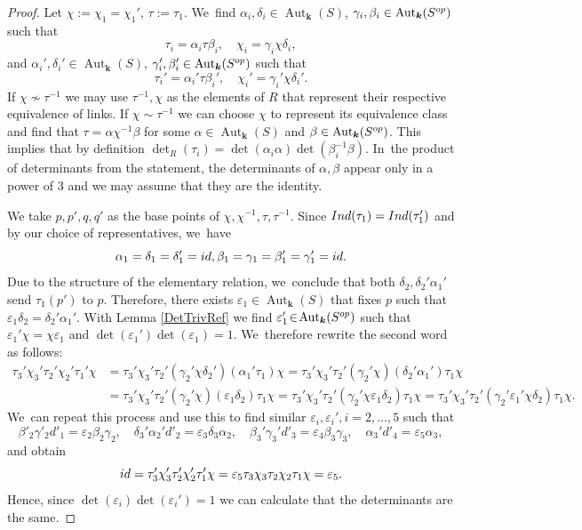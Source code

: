 \documentclass[10pt,a4paper]{amsart}
\newcommand{\id}{\textup{id}}
\newcommand{\Ind}{\textup{Ind}}
\newcommand{\op}{\textup{op}}
\let\epsilon\varepsilon
\theoremstyle{definition}
\newcommand{\kk}{{\boldsymbol{k}}}
\DeclareMathOperator{\Aut}{Aut}
\begin{document}
\begin{proof}
Let $\chi := \chi_1 = \chi_1'$, $\tau:= \tau_1$. We~find $\alpha_i, \delta_i \in \Aut_{\kk}(S)$, $\gamma_i, \beta_i \in \Aut_{\kk}(S^{\op}) $ such that
\[
\tau_i = \alpha_i \tau \beta_i, \quad \chi_i = \gamma_i \chi \delta_i,
\]
and $\alpha_i', \delta_i' \in \Aut_{\kk}(S)$, $\gamma_i', \beta_i' \in \Aut_{\kk}(S^{\op})$ such that
\[
\tau_i' = \alpha_i' \tau \beta_i', \quad \chi_i' = \gamma_i' \chi \delta_i'.
\]
If $\chi \not \sim \tau^{-1}$ we may use $\tau^{-1}, \chi$ as the elements of $R$ that represent their respective equivalence of links. If $\chi \sim \tau^{-1}$ we can choose $\chi$ to represent its equivalence class and find that $\tau = \alpha \chi^{-1} \beta$ for some $\alpha \in \Aut_{\kk}(S)$ and $\beta \in \Aut_{\kk}(S^{\op})$. This implies that by definition $\det_R(\tau_i) = \det(\alpha_i \alpha) \det(\beta_i^{-1} \beta)$. In~the product of determinants from the statement, the determinants of $\alpha, \beta$ appear only in a power of $3$ and we may assume that they are the identity.

We take $p,p',q,q'$ as the base points of $\chi, \chi^{-1},\tau,\tau^{-1}$. Since $\Ind(\tau_1) = \Ind(\tau_1')$ and by our choice of representatives, we~have
\[
\alpha_1 = \delta_1 = \delta_1' =\id, \beta_1=\gamma_1=\beta_1'= \gamma_1' = \id.
\]
Due to the structure of the elementary relation, we~conclude that both $\delta_2, \delta_2'\alpha_1'$ send $\tau_1(p')$ to $p$. Therefore, there exists $\epsilon_1 \in \Aut_{\kk}(S)$ that fixes $p$ such that $\epsilon_1\delta_2 = \delta_2'\alpha_1'$. With Lemma \ref{DetTrivRef} we find $\epsilon_1' \!\in\! \Aut_{\kk}(S^{\op})$ such that $\epsilon_1' \chi \!=\! \chi \epsilon_1$ and $\det(\epsilon_1')\det(\epsilon_1) \!=\! 1$. We~therefore rewrite the second word as follows:
\begin{align*}
\tau_3'\chi_3'\tau_2'\chi_2'\tau_1'\chi &= \tau_3'\chi_3'\tau_2'(\gamma_2'\chi\delta_2')(\alpha_1'\tau_1) \chi = \tau_3'\chi_3'\tau_2'(\gamma_2'\chi)(\delta_2'\alpha_1')\tau_1 \chi
\\
&= \tau_3'\chi_3'\tau_2'(\gamma_2'\chi) (\epsilon_1\delta_2) \tau_1\chi = \tau_3'\chi_3'\tau_2'(\gamma_2'\chi \epsilon_1 \delta_2) \tau_1 \chi = \tau_3'\chi_3'\tau_2'(\gamma_2'\epsilon_1'\chi \delta_2)\tau_1\chi.
\end{align*}
We~can repeat this process and use this to find similar $\epsilon_i,\epsilon_i', i = 2, \dots ,5$ such that
\[
\beta'_2\gamma'_2 d'_1 = \epsilon_2 \beta_2 \gamma_2 , \quad \delta_3'\alpha_{2}'d'_{2} = \epsilon_{3} \delta_3\alpha_2, \quad \beta_3'\gamma_3' d'_{3} = \epsilon_{4} \beta_3 \gamma_3, \quad \alpha_3'd'_{4} = \epsilon_5 \alpha_3,
\]
and obtain
\[
\id = \tau_3'\chi_3'\tau_2'\chi_2'\tau_1'\chi = \epsilon_5\tau_3\chi_3\tau_2\chi_2\tau_1\chi = \epsilon_5.
\]
Hence, since $\det(\epsilon_i)\det(\epsilon_i')=1$ we can calculate that the determinants are the same.
\end{proof}
\end{document}
